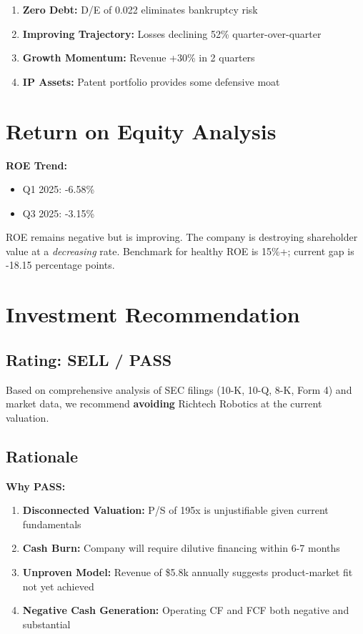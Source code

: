\documentclass[11pt,a4paper]{article}
\begin{document}
\begin{enumerate}[itemsep=6pt]
    \item \textbf{Zero Debt:} D/E of 0.022 eliminates bankruptcy risk
    \item \textbf{Improving Trajectory:} Losses declining 52\% quarter-over-quarter
    \item \textbf{Growth Momentum:} Revenue +30\% in 2 quarters
    \item \textbf{IP Assets:} Patent portfolio provides some defensive moat
\end{enumerate}

\section{Return on Equity Analysis}

\textbf{ROE Trend:}
\begin{itemize}[itemsep=2pt]
    \item Q1 2025: -6.58\%
    \item Q3 2025: -3.15\%
\end{itemize}

ROE remains negative but is improving. The company is destroying shareholder value at a \textit{decreasing} rate. Benchmark for healthy ROE is 15\%+; current gap is -18.15 percentage points.

\section{Investment Recommendation}

\subsection{Rating: \textcolor{bearish}{SELL / PASS}}

Based on comprehensive analysis of SEC filings (10-K, 10-Q, 8-K, Form 4) and market data, we recommend \textbf{avoiding} Richtech Robotics at the current valuation.

\subsection{Rationale}

\textbf{Why PASS:}
\begin{enumerate}[itemsep=4pt]
    \item \textbf{Disconnected Valuation:} P/S of 195x is unjustifiable given current fundamentals
    \item \textbf{Cash Burn:} Company will require dilutive financing within 6-7 months
    \item \textbf{Unproven Model:} Revenue of \$5.8k annually suggests product-market fit not yet achieved
    \item \textbf{Negative Cash Generation:} Operating CF and FCF both negative and substantial
\end{enumerate}
\end{document}
